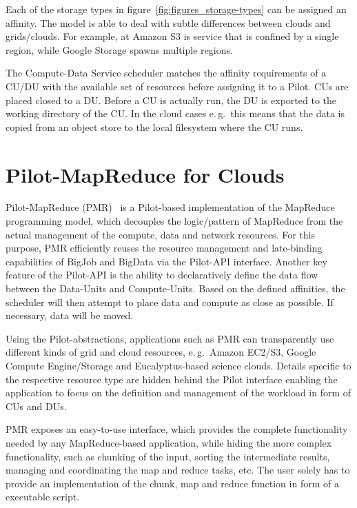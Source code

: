 \documentclass[times]{cpeauth}
\newcommand{\pilot}{Pilot\xspace}
\newcommand{\computedataservice}{Compute-Data Service\xspace}
\newcommand{\computeunits}{Compute-Units\xspace}
\newcommand{\dataunits}{Data-Units\xspace}
\newcommand{\du}{DU\xspace}
\newcommand{\dus}{DUs\xspace}
\newcommand{\cu}{CU\xspace}
\newcommand{\cus}{CUs\xspace}
\begin{document}
Each of the storage types in figure~\ref{fig:figures_storage-types} can be 
assigned an affinity. The model is able to deal with subtle differences 
between clouds and grids/clouds. For example, at Amazon S3 is service that is 
confined by a single region, while Google Storage spawns multiple regions.

The \computedataservice scheduler matches the affinity requirements of
a \cu/\du with the available set of resources before assigning it to a
\pilot.  \cus are placed closed to a \du. Before a \cu is actually
run, the \du is exported to the working directory of the \cu. In the
cloud cases e.\,g.\ this means that the data is copied from an object
store to the local filesystem where the \cu runs.


\section{Pilot-MapReduce for Clouds}

Pilot-MapReduce (PMR)~\cite{Mantha:2012:PEF:2287016.2287020} is a \pilot-based
implementation of the MapReduce programming model, which decouples the
logic/pattern of MapReduce from the actual management of the compute, data and
network resources. For this purpose, PMR efficiently reuses the resource
management and late-binding capabilities of BigJob and BigData via the 
Pilot-API interface. Another key feature of the Pilot-API is the ability to 
declaratively define the data flow between the \dataunits and \computeunits. 
Based on the defined affinities, the scheduler will then attempt to place data 
and compute as close as possible. If necessary, data will be moved. 

Using the \pilot-abstractions, applications such as PMR can transparently use
different kinds of grid and cloud resources, e.\,g.\ Amazon EC2/S3, Google
Compute Engine/Storage and Eucalyptus-based science clouds. Details specific
to the respective resource type are hidden behind the \pilot interface
enabling the application to focus on the definition and management of the
workload in form of \cus and \dus.

PMR exposes an easy-to-use interface, which provides the complete
functionality needed by any MapReduce-based application, while hiding the more
complex functionality, such as chunking of the input, sorting the intermediate
results, managing and coordinating the map and reduce tasks, etc. The user
solely has to provide an implementation of the chunk, map and reduce function
in form of a executable script.
\end{document}
